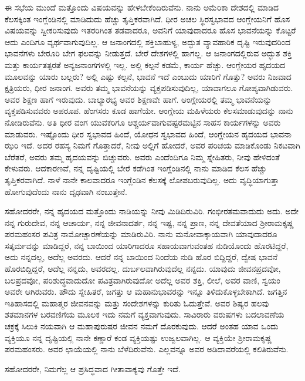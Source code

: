 ಈ ಸಭೆಯ ಮುಂದೆ ಮತ್ತೊಂದು ವಿಷಯವನ್ನು ಹೇಳಬೇಕೆಂದಿರುವೆನು. ನಾನು ಅಮೆರಿಕಾ ದೇಶದಲ್ಲಿ ಮಾಡಿದ ಕೆಲಸಕ್ಕಿಂತ ಇಂಗ್ಲೆಂಡಿನಲ್ಲಿ ಮಾಡಿದುದು ಹೆಚ್ಚು ತೃಪ್ತಿಕರವಾಗಿದೆ. ಧೀರ ಅಚಲ ಸ್ಥಿರಸ್ವಭಾವದ ಆಂಗ್ಲೇಯನಿಗೆ ಹೊಸ ವಿಷಯವನ್ನು ಸ್ವೀಕರಿಸುವುದು ಇತರರಿಗಿಂತ ತಡವಾದರೂ, ಅವನಿಗೆ ಯಾವುದಾದರೂ ಹೊಸ ಭಾವನೆಯನ್ನು ಕೊಟ್ಟರೆ ಆದು ಎಂದಿಗೂ ವ್ಯರ್ಥವಾಗುವುದಿಲ್ಲ. ಆ ಜನಾಂಗದಲ್ಲಿ ಶಕ್ತಿಬಾಹುಳ್ಯ, ಅದ್ಭುತ ವ್ಯಾವಹಾರಿಕ ದೃಷ್ಟಿ ಇರುವುದರಿಂದ ಭಾವನೆಗಳು ಬೇರೂರಿ ಬೇಗ ಫಲವನ್ನು ನೀಡುತ್ತದೆ. ಬೇರೆ ದೇಶಗಳಲ್ಲಿ ಹಾಗಲ್ಲ. ಆ ಜನಾಂಗದಲ್ಲಿರುವ ಅದ್ಭುತ ಶಕ್ತಿ ಮತ್ತು ಕಾರ್ಯತತ್ಪರತೆ ಅನ್ಯಜನಾಂಗಗಳಲ್ಲಿ ಇಲ್ಲ. ಅಲ್ಲಿ ಕಲ್ಪನೆ ಕಡಮೆ, ಕಾರ್ಯ ಹೆಚ್ಚು. ಆಂಗ್ಲೇಯರ ಹೃದಯದ ಮೂಲವನ್ನು ಯಾರು ಬಲ್ಲರು? ಅಲ್ಲಿ ಎಷ್ಟು ಕಲ್ಪನೆ, ಭಾವನೆ ಇದೆ ಎಂಬುದು ಯಾರಿಗೆ ಗೊತ್ತು? ಅವರು ನಿಜವಾದ ಕ್ಷತ್ರಿಯರು, ಧೀರ ಜನಾಂಗ. ಅವರು ತಮ್ಮ ಭಾವನೆಯನ್ನು ವ್ಯಕ್ತಪಡಿಸುವುದಿಲ್ಲ, ಯಾವಾಗಲೂ ಗೋಪ್ಯವಾಗಿಡುವರು. ಅವರ ಶಿಕ್ಷಣ ಹಾಗೆ ಇರುವುದು. ಬಾಲ್ಯಾರಭ್ಯ ಅವರ ಶಿಕ್ಷಣವೇ ಹಾಗೆ. ಆಂಗ್ಲೇಯರಲ್ಲಿ ತಮ್ಮ ಭಾವನೆಯನ್ನು ವ್ಯಕ್ತಪಡಿಸುವವರು ಅಪರೂಪ. ಹೆಂಗಸರು ಕೂಡ ಹಾಗೆಯೇ. ಆಂಗ್ಲೇಯ ಮಹಿಳೆಯರು ಕೆಲಸಮಾಡುವುದನ್ನು ನಾನು ನೋಡಿರುವೆನು. ಅತಿ ಧೀರ ವಂಗ ಯುವಕರಿಗೂ ಆಶ್ಚರ್ಯವಾಗುವಷ್ಟರಮಟ್ಟಿನ ಸಾಹಸ ಕಾರ್ಯಗಳನ್ನು ಅವರು ಮಾಡುವರು. ಇಷ್ಟೊಂದು ಧೀರ ಸ್ವಭಾವದ ಹಿಂದೆ, ಯೋಧನ ಸ್ವಭಾವದ ಹಿಂದೆ, ಆಂಗ್ಲೇಯನ ಹೃದಯದ ಭಾವನಾ ಝರಿ ಇದೆ. ಅದರ ರಹಸ್ಯ ನಿಮಗೆ ಗೊತ್ತಾದರೆ, ನೀವು ಅಲ್ಲಿಗೆ ಹೋದರೆ, ಅವರ ಪರಿಚಯ ಮಾಡಿಕೊಂಡು ನಿಕಟವಾಗಿ ಬೆರೆತರೆ, ಅವರು ತಮ್ಮ ಹೃದಯವನ್ನು ಬಿಚ್ಚುವರು. ಅವರು ಎಂದೆಂದಿಗೂ ನಿಮ್ಮ ಸ್ನೇಹಿತರು, ನೀವು ಹೇಳಿದಂತೆ ಕೇಳುವರು. ಆದಕಾರಣವೆ, ನನ್ನ ದೃಷ್ಟಿಯಲ್ಲಿ ಬೇರೆ ಕಡೆಗಿಂತ ಇಂಗ್ಲೆಂಡಿನಲ್ಲಿ ನಾನು ಮಾಡಿದ ಕೆಲಸ ಹೆಚ್ಚು ತೃಪ್ತಿಕರವಾಗಿದೆ. ನಾಳೆ ನಾನೇ ಕಾಲವಾದರೂ ಇಂಗ್ಲೆಂಡಿನ ಕೆಲಸಕ್ಕೆ ಲೋಪಬರುವುದಿಲ್ಲ. ಅದು ವೃದ್ಧಿಯಾಗುತ್ತಾ ಹೋಗುವುದೆಂದು ನಾನು ದೃಢವಾಗಿ ನಂಬುತ್ತೇನೆ.

ಸಹೋದರರೇ, ನನ್ನ ಹೃದಯದ ಮತ್ತೊಂದು ನಾಡಿಯನ್ನು ನೀವು ಮಿಡಿದಿರುವಿರಿ. ಗಂಭೀರತಮವಾದುದು ಅದು. ಅದೇ ನನ್ನ ಗುರುದೇವ, ನನ್ನ ಆಚಾರ್ಯ, ನನ್ನ ಜೀವನಾದರ್ಶ, ನನ್ನ ಇಷ್ಟ, ನನ್ನ ಪ್ರಾಣ, ನನ್ನ ದೇವತೆಯಾದ ಶ‍್ರೀರಾಮಕೃಷ್ಣ ಪರಮಹಂಸರ ಪವಿತ್ರ ನಾಮೋಚ್ಚಾರಣೆಯನ್ನು ಮಾಡಿರುವಿರಿ. ನಾನು ಮನೋವಾಕ್ಕಾಯವಾಗಿ ಯಾವುದಾದರೂ ಸತ್ಕರ್ಮವನ್ನು ಮಾಡಿದ್ದರೆ, ನನ್ನ ಬಾಯಿಂದ ಯಾರಿಗಾದರೂ ಸಹಾಯವಾಗುವಂತಹ ನುಡಿಯೊಂದು ಹೊರಟಿದ್ದರೆ, ಅದು ನನ್ನದಲ್ಲ, ಅದೆಲ್ಲ ಅವರದು. ಆದರೆ ನನ್ನ ಬಾಯಿಂದ ನಿಂದೆಯ ನುಡಿ ಹೊರ ಬಿದ್ದಿದ್ದರೆ, ದ್ವೇಷ ಭಾವನೆ ಹೊರಬಿದ್ದಿದ್ದರೆ, ಅದೆಲ್ಲ ನನ್ನದು, ಅವರದಲ್ಲ. ದುರ್ಬಲವಾಗಿರುವುದೆಲ್ಲ ನನ್ನದು. ಯಾವುದು ಜೀವನಪ್ರದವೋ, ಬಲಪ್ರದವೋ, ಪರಿಶುದ್ಧವಾದುದೋ ಪವಿತ್ರವಾಗಿರುವುದೋ ಅದೆಲ್ಲ ಅವರ ಶಕ್ತಿ, ಲೀಲೆ, ಅವರ ವಾಣಿ, ಸ್ವಯಂ ಅವರೇ ಆಗಿರುವರು. ಹೌದು ಸ್ನೇಹಿತರೆ, ಜಗತ್ತು ಆ ಮಹಾನುಭಾವರನ್ನು ಇನ್ನೂ ತಿಳಿದುಕೊಳ್ಳಬೇಕಾಗಿದೆ. ಜಗತ್ತಿನ ಇತಿಹಾಸದಲ್ಲಿ ಮಹಾತ್ಮರ ಜೀವನವನ್ನು ಮತ್ತು ಸಂದೇಶಗಳನ್ನು ಕುರಿತು ಓದುತ್ತೇವೆ. ಅವರ ಶಿಷ್ಯರ ಹಲವು ಶತಮಾನಗಳ ಬರವಣಿಗೆಯ ಮೂಲಕ ಇದು ನಮಗೆ ವ್ಯಕ್ತವಾಗುವುದು. ಸಾವಿರಾರು ವರುಷಗಳು ಬದಲಾವಣೆಯ ಚಕ್ರಕ್ಕೆ ಸಿಲುಕಿ ನಯವಾಗಿ ಆ ಮಹಾಪುರುಷರ ಜೀವನ ನಮಗೆ ದೊರಕುವುದು. ಆದರೆ ಅಂತಹ ಯಾವ ಒಂದು ವ್ಯಕ್ತಿಯೂ ನನ್ನ ದೃಷ್ಟಿಯಲ್ಲಿ ನಾನೇ ಕಣ್ಣಾರೆ ಕಂಡ ವ್ಯಕ್ತಿಯಷ್ಟು ಉಜ್ವಲವಾಗಿಲ್ಲ. ಆ ವ್ಯಕ್ತಿಯೇ ಶ‍್ರೀರಾಮಕೃಷ್ಣ ಪರಮಹಂಸರು. ಅವರ ಛಾಯೆಯಲ್ಲಿ ನಾನು ಬೆಳೆದಿರುವೆನು. ಎಲ್ಲವನ್ನೂ ಅವರ ಅಡಿದಾವರೆಯಲ್ಲಿ ಕಲಿತಿರುವೆನು.

ಸಹೋದರರೇ, ನಿಮಗೆಲ್ಲ ಆ ಪ್ರಸಿದ್ಧವಾದ ಗೀತಾವಾಕ್ಯವು ಗೊತ್ತೇ ಇದೆ.

